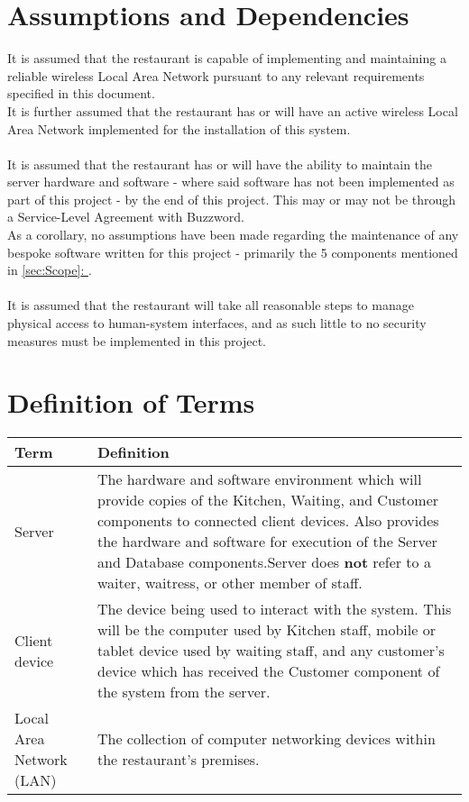 \documentclass[11pt, a4paper]{report}
\newcommand{\gref}[1]{\hyperref[#1]{\autoref*{#1}: \nameref{#1}}} %
\begin{document}
\section{Assumptions and Dependencies} \label{subsec:Assumptions}

It is assumed that the restaurant is capable of implementing and maintaining a reliable wireless Local Area Network pursuant to any relevant requirements specified in this document.\\
It is further assumed that the restaurant has or will have an active wireless Local Area Network implemented for the installation of this system.\\
\\
It is assumed that the restaurant has or will have the ability to maintain the server hardware and software - where said software has not been implemented as part of this project - by the end of this project. This may or may not be through a Service-Level Agreement with Buzzword.\\
As a corollary, no assumptions have been made regarding the maintenance of any bespoke software written for this project - primarily the 5 components mentioned in \gref{sec:Scope}.\\
\\
It is assumed that the restaurant will take all reasonable steps to manage physical access to human-system interfaces, and as such little to no security measures must be implemented in this project.

\section{Definition of Terms} \label{subsec:Definitions}
\vspace{1cm}

\begin{tabulary}{1.2\textwidth}{l L}
Term & Definition \\ \midrule

Server & The hardware and software environment which will provide copies of the Kitchen, Waiting, and Customer components to connected client devices. Also provides the hardware and software for execution of the Server and Database components.\newline Server does \textbf{not} refer to a waiter, waitress, or other member of staff. \\ \midrule
Client device & The device being used to interact with the system. This will be the computer used by Kitchen staff, mobile or tablet device used by waiting staff, and any customer's device which has received the Customer component of the system from the server.\\ \midrule
Local Area Network (LAN) & The collection of computer networking devices within the restaurant's premises.
\end{tabulary}

\nocite{*}
\printbibliography
\end{document}
